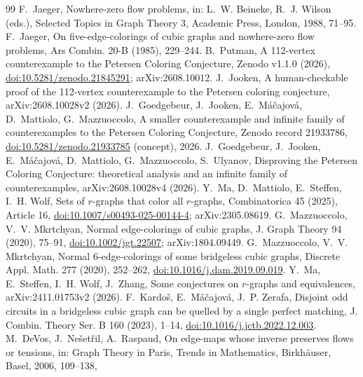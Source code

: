 \documentclass[11pt]{article}
\theoremstyle{definition}
\theoremstyle{remark}
\begin{document}
{\sloppy
\begin{thebibliography}{99}
 F.~Jaeger, Nowhere-zero flow problems, in: L.~W. Beineke, R.~J. Wilson
(eds.), Selected Topics in Graph Theory 3, Academic Press, London, 1988, 71--95.
 F.~Jaeger, On five-edge-colorings of cubic graphs and nowhere-zero flow problems,
Ars Combin. 20-B (1985), 229--244.
 B.~Putman, A 112-vertex counterexample to the Petersen Coloring Conjecture,
Zenodo v1.1.0 (2026), \href{https://doi.org/10.5281/zenodo.21845291}{doi:10.5281/zenodo.21845291};
arXiv:2608.10012.
 J.~Jooken, A human-checkable proof of the 112-vertex counterexample to the Petersen
coloring conjecture, arXiv:2608.10028v2 (2026).
 J.~Goedgebeur, J.~Jooken, E.~M\'a\v{c}ajov\'a, D.~Mattiolo, G.~Mazzuoccolo, A smaller
counterexample and infinite family of counterexamples to the Petersen Coloring Conjecture, Zenodo record
21933786, \href{https://doi.org/10.5281/zenodo.21933785}{doi:10.5281/zenodo.21933785} (concept), 2026.
 J.~Goedgebeur, J.~Jooken, E.~M\'a\v{c}ajov\'a, D.~Mattiolo, G.~Mazzuoccolo,
S.~Ulyanov, Disproving the Petersen Coloring Conjecture: theoretical analysis and an infinite
family of counterexamples, arXiv:2608.10028v4 (2026).
 Y.~Ma, D.~Mattiolo, E.~Steffen, I.~H. Wolf, Sets of $r$-graphs that color all
$r$-graphs, Combinatorica 45 (2025), Article 16,
\href{https://doi.org/10.1007/s00493-025-00144-4}{doi:10.1007/s00493-025-00144-4}; arXiv:2305.08619.
 G.~Mazzuoccolo, V.~V. Mkrtchyan, Normal edge-colorings of cubic graphs,
J. Graph Theory 94 (2020), 75--91, \href{https://doi.org/10.1002/jgt.22507}{doi:10.1002/jgt.22507};
arXiv:1804.09449.
 G.~Mazzuoccolo, V.~V. Mkrtchyan, Normal 6-edge-colorings of some
bridgeless cubic graphs, Discrete Appl. Math. 277 (2020), 252--262,
\href{https://doi.org/10.1016/j.dam.2019.09.019}{doi:10.1016/j.dam.2019.09.019}.
 Y.~Ma, E.~Steffen, I.~H. Wolf, J.~Zhang, Some conjectures on $r$-graphs and equivalences,
arXiv:2411.01753v2 (2026).
 F.~Kardo\v{s}, E.~M\'a\v{c}ajov\'a, J.~P. Zerafa, Disjoint odd circuits in a bridgeless cubic graph can
be quelled by a single perfect matching, J. Combin. Theory Ser. B 160 (2023), 1--14,
\href{https://doi.org/10.1016/j.jctb.2022.12.003}{doi:10.1016/j.jctb.2022.12.003}.
 M.~DeVos, J.~Ne\v{s}et\v{r}il, A.~Raspaud, On edge-maps whose inverse preserves flows or tensions,
in: Graph Theory in Paris, Trends in Mathematics, Birkh\"auser, Basel, 2006, 109--138,

\end{thebibliography}}
\end{document}
